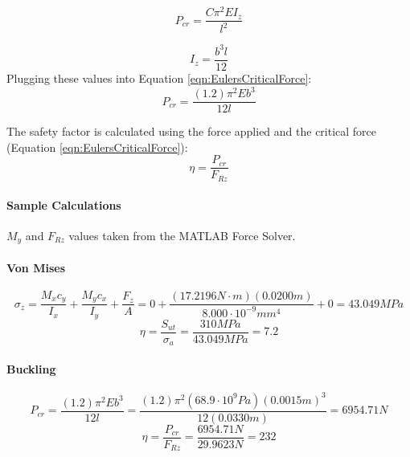\documentclass[../main.tex]{subfiles}
\begin{document}
\begin{equation} \label{eqn:EulersCriticalForce}
P_{cr} = \frac{C\pi^2EI_z}{l^2}
\end{equation}

\begin{equation}
I_z = \frac{b^3l}{12}
\end{equation}
Plugging these values into Equation \ref{eqn:EulersCriticalForce}:
\begin{equation}
P_{cr} = \frac{(1.2)\pi^2Eb^3}{12l}
\end{equation}

The safety factor is calculated using the force applied and the critical force (Equation \ref{eqn:EulersCriticalForce}):
\begin{equation}
\eta = \frac{P_{cr}}{F_{Rz}}
\end{equation}

\paragraph*{Sample Calculations}
$M_y$ and $F_{Rz}$ values taken from the MATLAB Force Solver.
\paragraph*{Von Mises}
$$\sigma_{z}={\frac{M_{x}c_y}{I_x}}+{\frac{M_{y}c_x}{I_y}}+{\frac{F_z}{A}}=0+\frac{(17.2196N\cdot{}m)(0.0200m)}{8.000\cdot{}10^{-9}mm^4}+0 = 43.049MPa$$
$$\eta = \dfrac{S_{ut}}{\sigma _a} = \dfrac{310MPa}{43.049MPa}=7.2$$
\paragraph*{Buckling}
$$P_{cr} = \frac{(1.2)\pi^2Eb^3}{12l}=\frac{(1.2)\pi^2(68.9\cdot{}10^9Pa)(0.0015m)^3}{12(0.0330m)}=6954.71N$$
$$\eta = \frac{P_{cr}}{F_{Rz}} = \frac{6954.71N}{29.9623N} = 232$$
\end{document}
